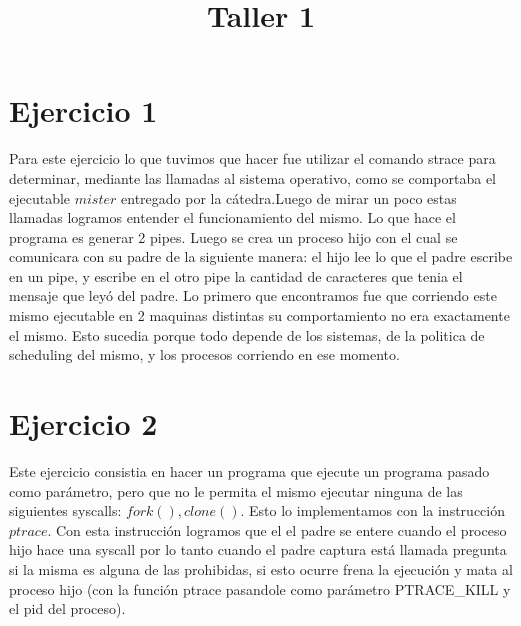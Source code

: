 \documentclass[a4paper, 10pt]{article}
\title{Taller 1}
\begin{document}
\maketitle

\newpage

\section{Ejercicio 1}
 Para este ejercicio lo que tuvimos que hacer fue utilizar el comando strace para determinar, mediante las llamadas al sistema operativo, como se comportaba el ejecutable $mister$ entregado por la c\'atedra.Luego de mirar un poco estas llamadas logramos entender el funcionamiento del mismo. Lo que hace el programa es generar 2 pipes. Luego se crea un proceso hijo con el cual se comunicara con su padre de la siguiente manera: el hijo lee lo que el padre escribe en un pipe, y escribe en el otro pipe la cantidad de caracteres que tenia el mensaje que ley\'o del padre. 
 Lo primero que encontramos fue que corriendo este mismo ejecutable en 2 maquinas distintas su comportamiento no era exactamente el mismo. Esto sucedia porque todo depende de los sistemas, de la politica de scheduling del mismo, y los procesos corriendo en ese momento. 
 


\section{Ejercicio 2}
 Este ejercicio consistia en hacer un programa que ejecute un programa pasado como par\'ametro, pero que no le permita el mismo ejecutar ninguna de las siguientes syscalls: $fork(), clone()$. Esto lo implementamos con la instrucci\'on $ptrace$. Con esta instrucci\'on logramos que el el padre se entere cuando el proceso hijo hace una syscall por lo tanto cuando el padre captura est\'a llamada pregunta si la misma es alguna de las prohibidas, si esto ocurre frena la ejecuci\'on y mata al proceso hijo (con la funci\'on ptrace pasandole como par\'ametro PTRACE\_KILL y el pid del proceso).
\end{document}
